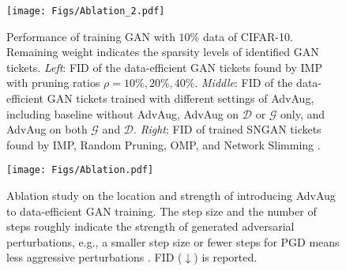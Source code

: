 \documentclass{article}
\begin{document}
\begin{figure}[t] 
\centering
\texttt{[image: Figs/Ablation\_2.pdf]}
\vspace{-6mm}
\caption{{\small Performance of training GAN with $10\%$ data of CIFAR-10. Remaining weight indicates the sparsity levels of identified GAN tickets. \textit{Left}: FID of the data-efficient GAN tickets found by IMP with pruning ratios $\rho=10\%,20\%,40\%$.} {\small \textit{Middle}: FID of the data-efficient GAN tickets trained with different settings of AdvAug, including baseline without AdvAug, AdvAug on $\mathcal{D}$ or $\mathcal{G}$ only, and AdvAug on both $\mathcal{G}$ and $\mathcal{D}$.} {\small \textit{Right}: FID of trained SNGAN tickets found by IMP, Random Pruning, OMP, and Network Slimming \cite{liu2017learning}.}}
\label{fig:aba}
\vspace{-3mm}
\end{figure}

\begin{figure}[t] 
\centering
\texttt{[image: Figs/Ablation.pdf]}
\vspace{-6mm}
\caption{\small Ablation study on the location and strength of introducing AdvAug to data-efficient GAN training. The step size and the number of steps roughly indicate the strength of generated adversarial perturbations, e.g., a smaller step size or fewer steps for PGD means less aggressive perturbations \cite{madry2017towards}. FID ($\downarrow$) is reported.}
\label{fig:ablation}
\vspace{-1em}
\end{figure}

\vspace{-0.5em}
\end{document}
